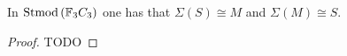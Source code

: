 \begin{remark}
\end{remark}

\begin{lemma} \label{lem:sigma_switch_s_m}
    In \( \operatorname{Stmod}\left(  {\mathbb{F}}_3C_3  \right) \) one has that \( \Sigma(S) \cong M \) and \( \Sigma(M) \cong S \).
\end{lemma}
\begin{proof}
    TODO
\end{proof}

